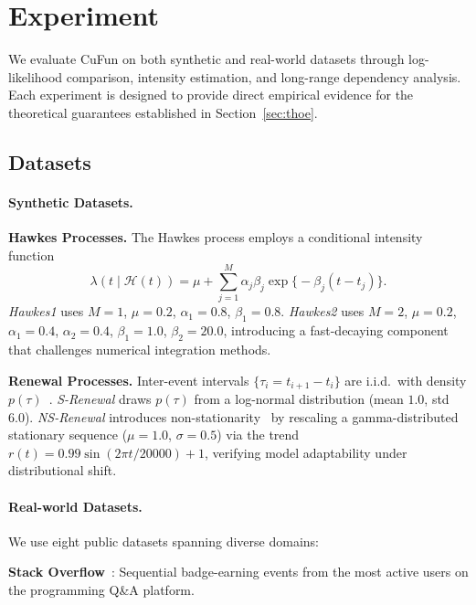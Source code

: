 \section{Experiment}\label{sec:exp}

We evaluate CuFun on both synthetic and real-world datasets through
log-likelihood comparison, intensity estimation, and long-range dependency
analysis. Each experiment is designed to provide direct empirical evidence
for the theoretical guarantees established in Section~\ref{sec:thoe}.

\subsection{Datasets}

\paragraph{Synthetic Datasets.}

\noindent\textbf{Hawkes Processes.}
The Hawkes process employs a conditional intensity function
\[
  \lambda(t\mid\mathcal{H}(t))
  = \mu + \sum_{j=1}^M \alpha_j\beta_j\exp\!\bigl\{-\beta_j(t-t_j)\bigr\}.
\]
\textit{Hawkes1} uses $M=1$, $\mu=0.2$, $\alpha_1=0.8$, $\beta_1=0.8$.
\textit{Hawkes2} uses $M=2$, $\mu=0.2$, $\alpha_1=0.4$, $\alpha_2=0.4$,
$\beta_1=1.0$, $\beta_2=20.0$, introducing a fast-decaying component
that challenges numerical integration methods.

\noindent\textbf{Renewal Processes.}
Inter-event intervals $\{\tau_i=t_{i+1}-t_i\}$ are i.i.d.\ with density
$p(\tau)$~\cite{omi2019fully}.
\textit{S-Renewal} draws $p(\tau)$ from a log-normal distribution
(mean $1.0$, std $6.0$).
\textit{NS-Renewal} introduces non-stationarity~\cite{lindqvist2003trend}
by rescaling a gamma-distributed stationary sequence
($\mu=1.0$, $\sigma=0.5$) via the trend $r(t)=0.99\sin(2\pi t/20000)+1$,
verifying model adaptability under distributional shift.

\paragraph{Real-world Datasets.}
We use eight public datasets spanning diverse domains:

\noindent\textbf{Stack Overflow}~\cite{du2016recurrent,grant2013encouraging}:
Sequential badge-earning events from the most active users on the
programming Q\&A platform.

